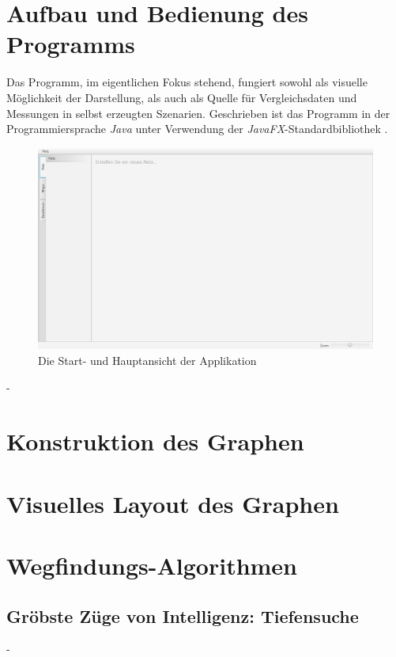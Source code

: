 \documentclass[12pt]{article}
\begin{document}
\section{Aufbau und Bedienung des Programms}
Das Programm, im eigentlichen Fokus stehend, fungiert sowohl als visuelle Möglichkeit der Darstellung, als auch als Quelle für Vergleichsdaten und Messungen in selbst erzeugten Szenarien.
Geschrieben ist das Programm in der Programmiersprache \textit{Java} unter Verwendung der \textit{JavaFX}-Standardbibliothek \cite{javafx}.
\begin{figure}[h!]
\includegraphics[width=\textwidth]{res/main_screenshot.png}
\centering
\caption{Die Start- und Hauptansicht der Applikation}
\end{figure}
\newpage
-
\newpage

\section{Konstruktion des Graphen}

\newpage

\section{Visuelles Layout des Graphen}
\label{sec:layout}
\newpage

\section{Wegfindungs-Algorithmen}
\newpage

\subsection{Gröbste Züge von Intelligenz: Tiefensuche}
\newpage
-
\newpage
\end{document}
